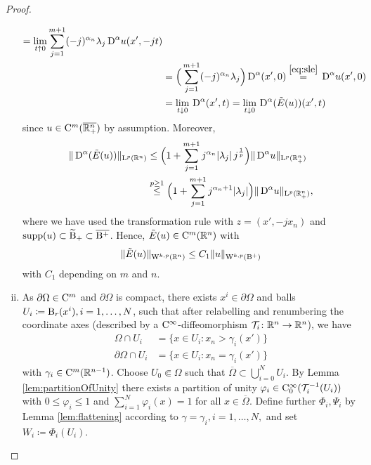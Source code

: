 \begin{proof}
\begin{enumerate}[i)]
\begin{align*}
        = \lim_{t \uparrow 0} \sum_{j = 1}^{m + 1} (-j)^{\alpha_n} \lambda_j \,{\operatorname{D}}^\alpha u(x', -jt) \\
        &= \Big(\sum_{j = 1}^{m + 1} (-j)^{\alpha_n} \lambda_j \Big) \,{\operatorname{D}}^\alpha(x',0)
        \overset{\eqref{eq:sle}}{=} \,{\operatorname{D}}^\alpha u(x', 0) \\
        &= \lim_{t \downarrow 0} \,{\operatorname{D}}^\alpha(x', t) 
        = \lim_{t \downarrow 0} \,{\operatorname{D}}^\alpha(\tilde E(u))(x', t)
      \end{align*}
      since $u \in \mathrm{C}^m(\overline{\mathbb{R}^n_+})$ by assumption.
      Moreover,
      \begin{align*}
        \|\,{\operatorname{D}}^\alpha(\tilde E(u)) \|_{\mathrm{L}^p(\mathbb{R}^n)}
       &\leq \Big( 1 + \sum_{j = 1}^{m + 1} j^{\alpha_n} |\lambda_j|\, j^{\frac{1}{p}} \Big) \|\,{\operatorname{D}}^\alpha u\|_{\mathrm{L}^p(\mathbb{R}^n_+)}  \\
       &\overset{p \geq 1}{\leq} \Big( 1 + \sum_{j = 1}^{m + 1} j^{\alpha_n + 1} |\lambda_j| \Big) \|\,{\operatorname{D}}^\alpha u\|_{\mathrm{L}^p(\mathbb{R}^n_+)},
      \end{align*}
      where we have used the transformation rule with $z = (x', -jx_n)$ and $\operatorname{supp}(u) \subset \widetilde {\mathrm{B}}_+ \subset \overline{\mathrm{B}^+}$.
      Hence, $\tilde E(u) \in\mathrm{C}^m(\mathbb{R}^n)$ with
      \begin{equation}
        \label{eq:contExt}
        \|\tilde E (u)\|_{\mathrm{W}^{k,p}(\mathbb{R}^n)} \leq C_1 \|u\|_{\mathrm{W}^{k,p}(\mathrm{B}^+)}
      \end{equation}
      with $C_1$ depending on $m$ and $n$.

    \item As $\partial \Omega \in \mathrm{C}^m$ and $\partial \Omega$ is compact, there exists $x^i \in \partial\Omega$ and balls $U_i \coloneqq \mathrm{B}_r(x^i), i = 1,\dots,N$, such that after relabelling and renumbering the coordinate axes (described by a $\mathrm{C}^\infty$\hyp{}diffeomorphism $\mathcal{T}_i \colon \mathbb{R}^n \to \mathbb{R}^n$), we have
      \begin{align*}
        \Omega \cap U_i &= \{ x \in U_i \colon x_n > \gamma_i(x') \} \\
        \partial\Omega \cap U_i &= \{x \in U_i \colon x_n = \gamma_i(x')\}
      \end{align*}
      with $\gamma_i \in \mathrm{C}^m(\mathbb{R}^{n - 1})$.
      Choose $U_0 \Subset \Omega$ such that $\overline\Omega \subset \bigcup_{i = 0}^N U_i$.
      By Lemma \ref{lem:partitionOfUnity} there exists a partition of unity $\varphi_i \in \mathrm{C}_0^\infty(\mathcal{T}_i^{-1}(U_i))$ with $0 \leq \varphi_i \leq 1$ and $\sum_{i = 1}^N \varphi_i(x) = 1$ for all $x \in \overline\Omega$.
      Define further $\Phi_i,\Psi_i$ by Lemma \ref{lem:flattening} according to $\gamma = \gamma_i, i = 1,\dots,N,$ and set $W_i \coloneqq \Phi_i(U_i)$.


\end{enumerate}
\end{proof}
